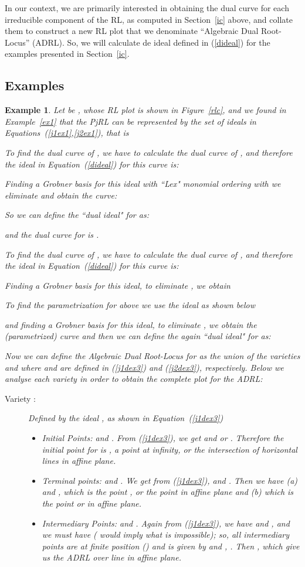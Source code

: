 \documentclass{article}
\newtheorem{example}{Example}[section]
\begin{document}
In our context, we are primarily interested in obtaining the dual curve for each irreducible component of
the RL, as computed in Section~\ref{ic} above, and collate them to construct a new RL plot that we 
denominate ``Algebraic Dual Root-Locus'' (ADRL). So, we will calculate de ideal defined in (\ref{dideal})
for the examples presented in Section~\ref{ic}.

\subsection{Examples}

\begin{example}\label{ex3}\em
Let be , whose RL plot is shown in Figure~\ref{rlc}, and
we found in Example~\ref{ex1} that the PjRL can be represented by the set
of ideals in Equations~(\ref{j1ex1},\ref{j2ex1}), that is 


To find the dual curve of , we have to calculate the dual curve of 
, and therefore the ideal in Equation~(\ref{dideal})
for this curve is:

Finding a Grobner basis for this ideal with ``Lex" monomial ordering with 
 we eliminate  and obtain the curve:

So we can define the ``dual ideal" for  as:

and the dual curve for  is .

To find the dual curve of , we have to calculate the dual curve of 
, and therefore the ideal in Equation~(\ref{dideal})
for this curve is:

Finding a Grobner basis for this ideal, to eliminate , we obtain

To find the parametrization for  above we use the ideal
as shown below

and finding a Grobner basis for this ideal, to eliminate , we obtain
the (parametrized) curve   and then we can define 
the again ``dual ideal" for  as:

Now we can define the Algebraic Dual Root-Locus for  as the union 
of the varieties  and  where  and 
are defined in (\ref{j1dex3}) and (\ref{j2dex3}), respectively. Below we analyse each variety 
in order to obtain the complete plot for the ADRL:

\begin{description}
\item[Variety :] Defined by the ideal , as shown in Equation~(\ref{j1dex3})
\begin{itemize}
\item Initial Points:  and . From (\ref{j1dex3}), we get  and  or . 
Therefore the initial point 
for  is , a point at infinity, or the intersection of horizontal lines in affine  plane.
\item Terminal points:  and . We get from (\ref{j1dex3}),  and . Then we have (a)  
and , which is
the point , or the point  in affine plane  and (b)  which is the point  or  
in affine  plane.
\item Intermediary Points:  and . Again from (\ref{j1dex3}), we have  and 
,
and we must have  ( would imply  what is impossible); so, all intermediary points are at finite position 
() and is given by
 and , . Then , which give us the 
ADRL over  line in affine  plane.


\end{itemize}
\end{description}
\end{example}
\end{document}
